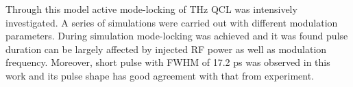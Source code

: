 \documentclass[11pt,final]{scrbook}
\begin{document}
Through this model active mode-locking of THz QCL was intensively investigated. A series of simulations were carried out with different modulation parameters. During simulation mode-locking was achieved and it was found pulse duration can be largely affected by injected RF power as well as modulation frequency. Moreover, short pulse with FWHM of 17.2 ps was observed in this work and its pulse shape has good agreement with that from experiment.




\renewcommand*{\bibname}{Bibliography} %
{}


\end{document}
